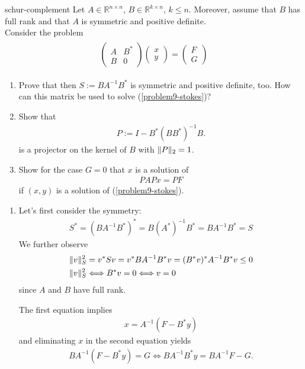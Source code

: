 \begin{Problem}{schur-complement}
Let $A\in\mathbb{R}^{n\times n}$, $B\in\mathbb{R}^{k\times n}$, $k\leq n$.
Moreover, assume that $B$ has full rank and that $A$ is symmetric and
positive definite.\\
Consider the problem
\begin{align}
\begin{aligned}
\begin{pmatrix} A & B^* \\ B & 0 \end{pmatrix}
\begin{pmatrix} x \\ y \end{pmatrix}
= \begin{pmatrix} F \\ G \end{pmatrix}
\end{aligned}
\tag{*}
\label{problem9-stokes}
\end{align}
\begin{enumerate}
\item Prove that then $S := BA^{-1}B^*$ is symmetric and positive definite, too.
How can this matrix be used to solve (\ref{problem9-stokes})?
\item Show that
\begin{align}
 P := I - B^*(BB^*)^{-1}B.
\end{align}
is a projector on the kernel of $B$ with $\lVert P\rVert_2=1$.
\item Show for the case $G = 0$ that $x$ is a solution of
\begin{align}
PAPx = PF
\end{align}
if $(x,y)$ is a solution of (\ref{problem9-stokes}).
\end{enumerate}
\begin{solution}
\begin{enumerate}
 \item Let's first consider the symmetry:
  \begin{align}
    S^*=(BA^{-1}B^*)^*=B(A^*)^{-1}B^*=BA^{-1}B^*=S
  \end{align}
  We further observe
  \begin{align}
   \lVert v\rVert_S^2 &= v^*Sv = v^*BA^{-1}B^*v = (B^*v)^*A^{-1}B^*v \leq 0 \\
   \lVert v\rVert_S^2 &\Longleftrightarrow B^*v = 0 \Longleftrightarrow v=0
  \end{align}
  since $A$ and $B$ have full rank.

  The first equation implies
  \begin{align}
   x=A^{-1} (F-B^* y)
  \end{align}
  and eliminating $x$ in the second equation yields
  \begin{align}
   BA^{-1} (F-B^* y)=G \Longleftrightarrow BA^{-1} B^* y=BA^{-1} F-G.
   \end{align}


\end{enumerate}
\end{solution}
\end{Problem}
